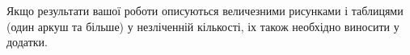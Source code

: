 \label{appendix:B}

Якщо результати вашої роботи описуються величезними рисунками і таблицями
(один аркуш та більше) у незліченній кількості, іх також необхідно
виносити у додатки.


